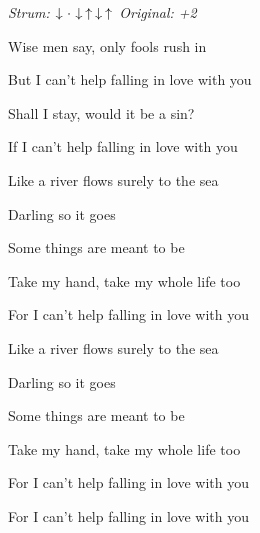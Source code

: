 \begin{song}


 \quad
\textit{Strum:} $\Down\Miss\Down\Up\Down\Up$ \quad
\textit{Original: +2}

\large


\Large

\bigskip

Wise men say, only fools rush in \par
But I can't help falling in love with you 

\bigskip

Shall I stay, would it be a sin? \par
If I can't help falling in love with you 

\bigskip

Like a river flows surely to the sea \par
{}Darling so it goes \par
{}Some things  are meant to be 

\bigskip

Take my hand, take my whole life too \par
For I can't help falling in love with you 

\bigskip

Like a river flows surely to the sea \par
{}Darling so it goes \par
{}Some things  are meant to be 

\bigskip

Take my hand, take my whole life too \par
For I can't help falling in love with you \par
For I can't help falling in love with you \par

\end{song}